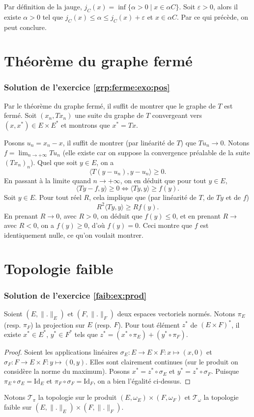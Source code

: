Par définition de la jauge, $j_C(x)= \inf\{\alpha > 0 \mid x\in \alpha C\}$.
Soit $\varepsilon >0$, alors il existe $\alpha > 0$ tel que $j_C(x)\leq
\alpha \leq j_C(x) + \varepsilon$ et $x\in\alpha C$. Par ce qui précède,
on peut conclure.

\section{Théorème du graphe fermé}
\subsubsection*{Solution de l'exercice \ref{grp:ferme:exo:pos}}
Par le théorème du graphe fermé, il suffit de montrer que le graphe
de $T$ est fermé. Soit $(x_n, Tx_n)$ une suite du graphe de $T$ convergeant
vers $(x, x^*)\in E\times E^*$ et montrons que $x^* = Tx$.

Posons $u_n = x_n - x$, il suffit de montrer (par linéarité de $T$) que
$Tu_n \to 0$. Notons $f = \lim_{n\to+\infty}Tu_n$ (elle existe car on suppose
la convergence préalable de la suite $(Tx_n)_n$). Quel que soit $y\in E$, on a
$$\langle T(y - u_n), y - u_n\rangle \geq 0.$$
En passant à la limite quand $n\to+\infty$, on en déduit que pour tout $y\in E$,
$$\langle Ty - f, y\rangle \geq 0 \iff
\langle Ty, y\rangle \geq f(y).$$
Soit $y\in E$. Pour tout réel $R$, cela implique que
(par linéarité de $T$, de $Ty$ et de $f$)
$$R^2\langle Ty, y\rangle \geq R f(y).$$
En prenant $R\to 0$, avec $R> 0$, on déduit que $f(y)\leq 0$, et en prenant
$R \to$ avec $R < 0$, on a $f(y) \geq 0$, d'où $f(y) = 0$. Ceci montre que
$f$ est identiquement nulle, ce qu'on voulait montrer.

\section{Topologie faible}
\subsubsection*{Solution de l'exercice \ref{faib:ex:prod}}
\begin{lem}
  Soient $(E, \|.\|_E)$ et $(F, \|.\|_F)$ deux espaces vectoriels normés.
  Notons $\pi_E$ (resp. $\pi_F$) la projection sur $E$ (resp. $F$).
  Pour tout élément $z^*$ de $(E\times F)^*$, il existe $x^*\in E^*$,
  $y^*\in F^*$ tels que $z^* = (x^*\circ \pi_E) + (y^*\circ\pi_F)$.
\end{lem}
\begin{proof}
  Soient les applications linéaires
  $\sigma_E:E\to E\times F: x\mapsto (x, 0)$ et
  $\sigma_F:F\to E\times F: y\mapsto (0, y)$. Elles sont clairement
  continues (sur le produit on considère la norme du maximum).
  Posons $x^* = z^*\circ \sigma_E$ et $y^* = z^*\circ \sigma_F$. Puisque
  $\pi_E\circ \sigma_E =\mathrm{Id}_E$ et  $\pi_F\circ \sigma_F =\mathrm{Id}_F$,
  on a bien l'égalité ci-dessus.
\end{proof}
Notons $\mathcal{T}_\pi$ la topologie sur le produit
$(E, \omega_E)\times(F, \omega_F)$ et $\mathcal{T}_\omega$ la topologie
faible sur $(E, \|.\|_E)\times(F, \|.\|_F)$.


